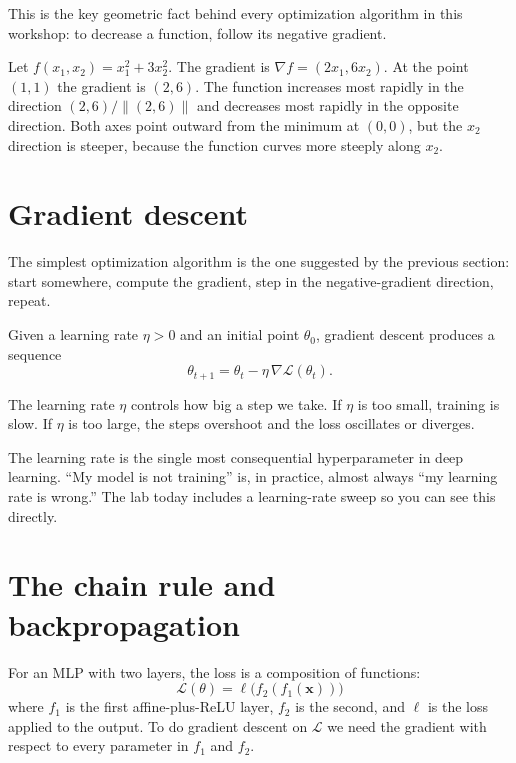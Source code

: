 This is the key geometric fact behind every optimization algorithm in this workshop: to decrease a function, follow its negative gradient.

\begin{example}
Let $f(x_1, x_2) = x_1^2 + 3 x_2^2$. The gradient is $\nabla f = (2 x_1, 6 x_2)$. At the point $(1, 1)$ the gradient is $(2, 6)$. The function increases most rapidly in the direction $(2, 6)/\|(2, 6)\|$ and decreases most rapidly in the opposite direction. Both axes point outward from the minimum at $(0, 0)$, but the $x_2$ direction is steeper, because the function curves more steeply along $x_2$.
\end{example}

\section{Gradient descent}

The simplest optimization algorithm is the one suggested by the previous section: start somewhere, compute the gradient, step in the negative-gradient direction, repeat.

\begin{definition}
Given a learning rate $\eta > 0$ and an initial point $\theta_0$, gradient descent produces a sequence
\[
\theta_{t+1} = \theta_t - \eta \, \nabla \mathcal{L}(\theta_t).
\]
\end{definition}

The learning rate $\eta$ controls how big a step we take. If $\eta$ is too small, training is slow. If $\eta$ is too large, the steps overshoot and the loss oscillates or diverges.

\begin{warningbox}
The learning rate is the single most consequential hyperparameter in deep learning. ``My model is not training'' is, in practice, almost always ``my learning rate is wrong.'' The lab today includes a learning-rate sweep so you can see this directly.
\end{warningbox}

\section{The chain rule and backpropagation}

For an MLP with two layers, the loss is a composition of functions:
\[
\mathcal{L}(\theta) = \ell\bigl(f_2(f_1(\bm{x}))\bigr)
\]
where $f_1$ is the first affine-plus-ReLU layer, $f_2$ is the second, and $\ell$ is the loss applied to the output. To do gradient descent on $\mathcal{L}$ we need the gradient with respect to every parameter in $f_1$ and $f_2$.

